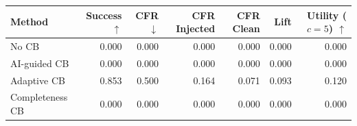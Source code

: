 \begin{tabular}{lrrrrrr}
\toprule
Method & Success $\uparrow$ & CFR $\downarrow$ & CFR Injected & CFR Clean & Lift & Utility ($c=5$) $\uparrow$ \\
\midrule
No CB & 0.000 & 0.000 & 0.000 & 0.000 & 0.000 & 0.000 \\
AI-guided CB & 0.000 & 0.000 & 0.000 & 0.000 & 0.000 & 0.000 \\
Adaptive CB & 0.853 & 0.500 & 0.164 & 0.071 & 0.093 & 0.120 \\
Completeness CB & 0.000 & 0.000 & 0.000 & 0.000 & 0.000 & 0.000 \\
\bottomrule
\end{tabular}
